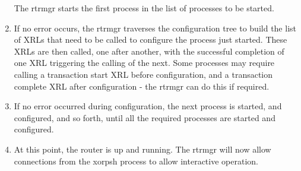 \documentclass[11pt]{article}
\begin{document}
\begin{enumerate}
The rtrmgr starts the first process in the list of processes to be
started.
\item
If no error occurs, the rtrmgr traverses the configuration tree to
build the list of XRLs that need to be called to configure the process
just started.  These XRLs are then called, one after another, with the
successful completion of one XRL triggering the calling of the next.
Some processes may require calling a transaction start XRL before
configuration, and a transaction complete XRL after configuration -
the rtrmgr can do this if required.
\item
If no error occurred during configuration, the next process is started,
and configured, and so forth, until all the required processes are
started and configured.
\item 
At this point, the router is up and running.  The rtrmgr will now
allow connections from the xorpsh process to allow interactive
operation.
\end{enumerate}
\newpage
\end{document}
